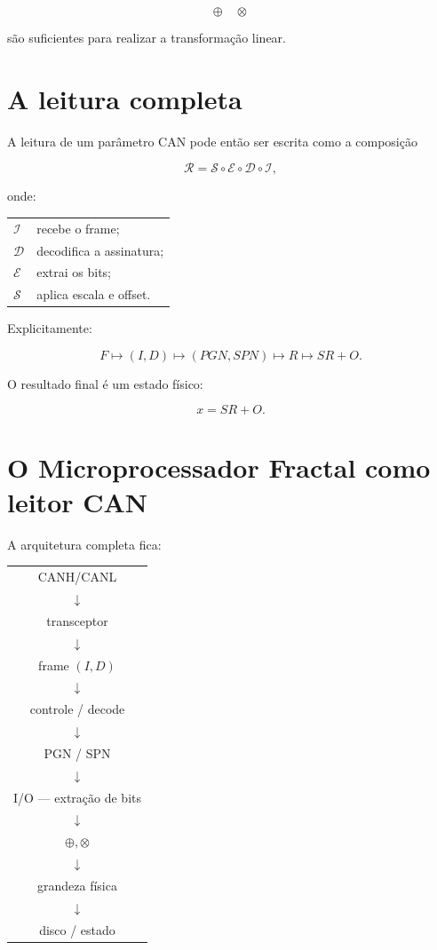 \documentclass[11pt,a4paper]{article}
\begin{document}
\[
\boxed{
\oplus \quad \otimes
}
\]

são suficientes para realizar a transformação linear.


\section{A leitura completa}

A leitura de um parâmetro CAN pode então ser escrita como a composição

\[
\mathcal{R}
=
\mathcal{S}
\circ
\mathcal{E}
\circ
\mathcal{D}
\circ
\mathcal{I},
\]

onde:

\begin{center}
\begin{tabular}{ll}
$\mathcal{I}$ & recebe o frame;\\
$\mathcal{D}$ & decodifica a assinatura;\\
$\mathcal{E}$ & extrai os bits;\\
$\mathcal{S}$ & aplica escala e offset.
\end{tabular}
\end{center}

Explicitamente:

\[
F
\longmapsto
(I,D)
\longmapsto
(PGN,SPN)
\longmapsto
R
\longmapsto
SR+O.
\]

O resultado final é um estado físico:

\[
\boxed{x=SR+O}.
\]


\section{O Microprocessador Fractal como leitor CAN}

A arquitetura completa fica:

\begin{center}
\begin{tabular}{c}
CANH/CANL
\\
$\downarrow$
\\
transceptor
\\
$\downarrow$
\\
frame $(I,D)$
\\
$\downarrow$
\\
controle / decode
\\
$\downarrow$
\\
PGN / SPN
\\
$\downarrow$
\\
I/O --- extração de bits
\\
$\downarrow$
\\
$\oplus,\otimes$
\\
$\downarrow$
\\
grandeza física
\\
$\downarrow$
\\
disco / estado
\end{tabular}
\end{center}
\end{document}

